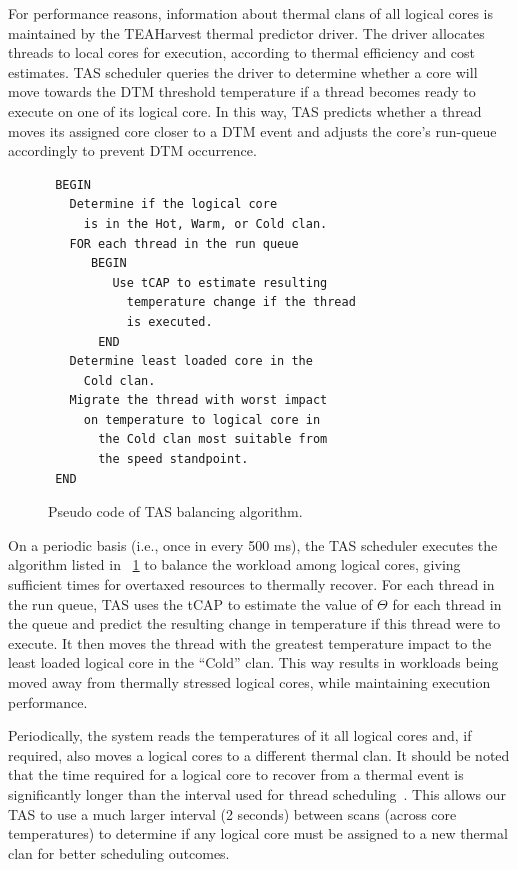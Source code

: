 \documentclass[times, 10pt,twocolumn]{IEEEtran}
\begin{document}
For performance reasons, information about thermal clans of all logical
cores is maintained by the TEAHarvest thermal predictor driver.  The
driver allocates threads to local cores for execution, according to
thermal efficiency and cost estimates.  TAS scheduler queries the driver
to determine whether a core will move towards the DTM threshold
temperature if a thread becomes ready to execute on one of its logical
core.  In this way, TAS predicts whether a thread moves its assigned
core closer to a DTM event and adjusts the core's run-queue accordingly
to prevent DTM occurrence.

 \begin{figure}[t] 
 \centering
 \begin{verbatim} 
 BEGIN 
   Determine if the logical core 
     is in the Hot, Warm, or Cold clan.  
   FOR each thread in the run queue 
      BEGIN 
         Use tCAP to estimate resulting 
           temperature change if the thread 
           is executed. 
       END 
   Determine least loaded core in the
	 Cold clan.  
   Migrate the thread with worst impact 
	 on temperature to logical core in
       the Cold clan most suitable from
       the speed standpoint.  
 END
 \end{verbatim}
 \caption{Pseudo code of TAS balancing algorithm.}
 \label{fig:tascode}
 \end{figure}
 

On a periodic basis (i.e., once in every 500 ms), the TAS scheduler executes the algorithm listed in \figurename~\ref{fig:tascode} to balance the workload among logical cores, giving sufficient times for overtaxed resources to thermally recover. 
For each thread in the run queue, TAS uses the tCAP to estimate 
the value of $\Theta$ for each
thread in the queue and predict the resulting change in temperature if
this thread were to execute.  It then moves the thread with the greatest
temperature impact to the least loaded logical core in the ``Cold''
clan.  This way results in workloads being moved away from thermally
stressed logical cores, while maintaining execution performance.

Periodically, the system reads the temperatures of it all logical cores
and, if required, also moves a logical cores to a different thermal
clan.  It should be noted that the time required for a logical core to
recover from a thermal event is significantly longer than the interval
used for thread scheduling~\cite{Choi2007}. This allows our TAS to use a
much larger interval (2 seconds) between scans (across core
temperatures) to determine if any logical core must be assigned to a new
thermal clan for better scheduling outcomes.
\end{document}
